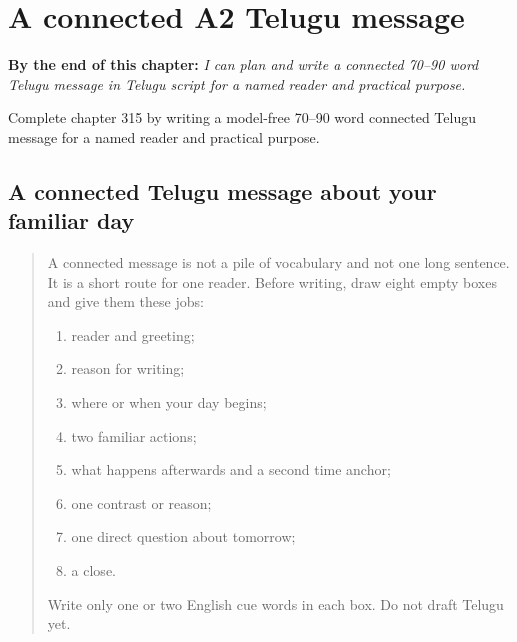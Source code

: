 
\chapter{A connected A2 Telugu message}
\label{ch:te-a-connected-a2-telugu-message}

\begin{chapteropening}
\textbf{By the end of this chapter:} \emph{I can plan and write a connected 70–90 word Telugu message in Telugu script for a named reader and practical purpose.}

Complete chapter 315 by writing a model-free 70–90 word connected Telugu message for a named reader and practical purpose.
\end{chapteropening}

\section[(connected A2 Telugu writing)]{A connected Telugu message about your familiar day}

\label{lesson:TE-W315-a2-connected-composition}



\begin{quote}
A connected message is not a pile of vocabulary and not one long sentence. It is a short route for one reader. Before writing, draw eight empty boxes and give them these jobs:

\begin{enumerate}
\raggedright
  \item reader and greeting;
  \item reason for writing;
  \item where or when your day begins;
  \item two familiar actions;
  \item what happens afterwards and a second time anchor;
  \item one contrast or reason;
  \item one direct question about tomorrow;
  \item a close.
\end{enumerate}

Write only one or two English cue words in each box. Do not draft Telugu yet.
\end{quote}

